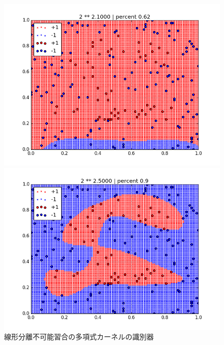 \documentclass[]{jsarticle}
\begin{document}
\begin{figure}[htbp]
 \begin{minipage}[b]{0.5\hsize}
  \includegraphics[scale=0.4]{./cross_validate_images/polym_te/1.png}
 \end{minipage}
 \begin{minipage}[b]{0.5\hsize}
  \includegraphics[scale=0.4]{./cross_validate_images/polym_te/2.png}
 \end{minipage}
 \caption{線形分離不可能習合の多項式カーネルの識別器}
\end{figure}
\end{document}
